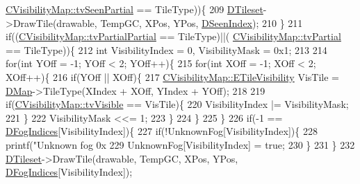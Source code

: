 \begin{DoxyCode}
      \hyperlink{classCVisibilityMap_a6665f905da08825adbb0eee7bd1f2f30a7f9292f5d7ed9e9497f8ef342c890466}{CVisibilityMap::tvSeenPartial} == TileType))\{
209                 \hyperlink{classCFogRenderer_af9f3956c6e371f112ee1ce5decd7ae89}{DTileset}->DrawTile(drawable, TempGC, XPos, YPos, 
      \hyperlink{classCFogRenderer_acac9ab2c0a8023661ab1aa096d713458}{DSeenIndex});
210             \}
211             \textcolor{keywordflow}{if}((\hyperlink{classCVisibilityMap_a6665f905da08825adbb0eee7bd1f2f30a75af969b6d667b802b64bacd8bca7b63}{CVisibilityMap::tvPartialPartial} == TileType)||(
      \hyperlink{classCVisibilityMap_a6665f905da08825adbb0eee7bd1f2f30a0037f47075e3bde5e8e32dbd55754976}{CVisibilityMap::tvPartial} == TileType))\{
212                 \textcolor{keywordtype}{int} VisibilityIndex = 0, VisibilityMask = 0x1;
213                 
214                 \textcolor{keywordflow}{for}(\textcolor{keywordtype}{int} YOff = -1; YOff < 2; YOff++)\{
215                     \textcolor{keywordflow}{for}(\textcolor{keywordtype}{int} XOff = -1; XOff < 2; XOff++)\{
216                         \textcolor{keywordflow}{if}(YOff || XOff)\{
217                             \hyperlink{classCVisibilityMap_a6665f905da08825adbb0eee7bd1f2f30}{CVisibilityMap::ETileVisibility} VisTile = 
      \hyperlink{classCFogRenderer_a06be3616da23b5fce8ab3407b81788a4}{DMap}->TileType(XIndex + XOff, YIndex + YOff);
218                             
219                             \textcolor{keywordflow}{if}(\hyperlink{classCVisibilityMap_a6665f905da08825adbb0eee7bd1f2f30a3c881652ef7164aa086e595eef0ff5d6}{CVisibilityMap::tvVisible} == VisTile)\{
220                                 VisibilityIndex |= VisibilityMask;   
221                             \}
222                             VisibilityMask <<= 1;
223                         \}
224                     \}
225                 \}
226                 \textcolor{keywordflow}{if}(-1 == \hyperlink{classCFogRenderer_a2028e4642e756016819aab6567800af5}{DFogIndices}[VisibilityIndex])\{
227                     \textcolor{keywordflow}{if}(!UnknownFog[VisibilityIndex])\{
228                         printf(\textcolor{stringliteral}{"Unknown fog 0x%
229                         UnknownFog[VisibilityIndex] = \textcolor{keyword}{true};
230                     \}
231                 \}
232                 \hyperlink{classCFogRenderer_af9f3956c6e371f112ee1ce5decd7ae89}{DTileset}->DrawTile(drawable, TempGC, XPos, YPos, 
      \hyperlink{classCFogRenderer_a2028e4642e756016819aab6567800af5}{DFogIndices}[VisibilityIndex]);
}
\end{DoxyCode}
